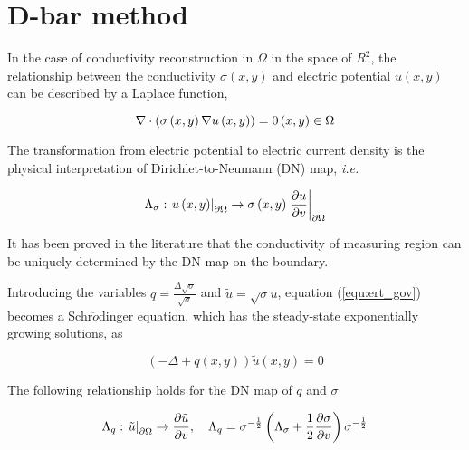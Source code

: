 

%

\section{D-bar method}
\label{sec:D-bar method}

In the case of conductivity reconstruction in $\Omega $ in the space of ${R^2}$, the relationship between the conductivity $\sigma (x,y)$ and electric potential $u(x,y)$ can be described by a Laplace function,

\begin{equation}\label{equ:ert_gov}
\nabla  \cdot \left( {\sigma \left( {x,y} \right)\nabla u\left( {x,y} \right)} \right) = 0 \left( {x,y} \right) \in {\rm{\Omega }}
\end{equation}

The transformation from electric potential to electric current density is the physical interpretation of Dirichlet-to-Neumann (DN) map, \emph{i.e.}

\begin{equation}\label{equ:DN_sig}
{\Lambda _\sigma }:{\left. {u\left( {x,y} \right)} \right|_{\partial {\rm{\Omega }}}} \to \sigma \left( {x,y} \right){\left. {\frac{{\partial u}}{{\partial v}}} \right|_{\partial {\rm{\Omega }}}}
\end{equation}

It has been proved in the literature \cite{Brown1997UniquenessIT,Nachman1996Global} that the conductivity of measuring region can be uniquely determined by the DN map on the boundary.

Introducing the variables $q = \frac{{\Delta \sqrt \sigma  }}{{\sqrt \sigma  }}$ and $\tilde u = \sqrt \sigma  u$, equation (\ref{equ:ert_gov}) becomes a Schr$\ddot{o}$dinger equation, which has the steady-state exponentially growing solutions, as

\begin{equation}\label{equ:Schr}
\left( { - \Delta  + q\left( {x,y} \right)} \right)\tilde u\left( {x,y} \right) = 0
\end{equation}

The following relationship holds for the DN map of $q$ and  $\sigma $ \cite{Deangelo20102D}

\begin{equation}\label{equ:DN_q_sig}
{\Lambda _q}:{\left. {\tilde u} \right|_{\partial {\rm{\Omega }}}} \to \frac{{\partial \tilde u}}{{\partial v}}, \quad {\Lambda _q} = {\sigma ^{ - \frac{1}{2}}} \left( {{\Lambda _\sigma } + \frac{1}{2}\frac{{\partial \sigma }}{{\partial v}}} \right){\sigma ^{ - \frac{1}{2}}}
\end{equation}

